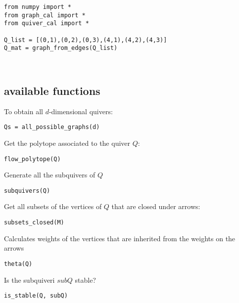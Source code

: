 \documentclass{article}
\begin{document}
\begin{minipage}{0.65\textwidth}
\begin{Verbatim}
from numpy import *
from graph_cal import *
from quiver_cal import *

Q_list = [(0,1),(0,2),(0,3),(4,1),(4,2),(4,3)]
Q_mat = graph_from_edges(Q_list)
\end{Verbatim}
\end{minipage}~
\begin{minipage}{0.3\textwidth}
\end{minipage}

\subsection{available functions}
To obtain all $d$-dimensional quivers: 
\begin{Verbatim}
Qs = all_possible_graphs(d)
\end{Verbatim}
Get the polytope associated to the quiver $Q$: 
\begin{Verbatim}
flow_polytope(Q)
\end{Verbatim}
Generate all the subquivers of $Q$
\begin{Verbatim}
subquivers(Q)
\end{Verbatim}
Get all subsets of the vertices of $Q$ that are closed under arrows:
\begin{Verbatim}
subsets_closed(M)
\end{Verbatim}
Calculates weights of the vertices that are inherited from the weights on the arrows
\begin{Verbatim}
theta(Q)
\end{Verbatim}
Is the subquiveri $subQ$ stable? 
\begin{Verbatim}
is_stable(Q, subQ)
\end{Verbatim}
\end{document}

